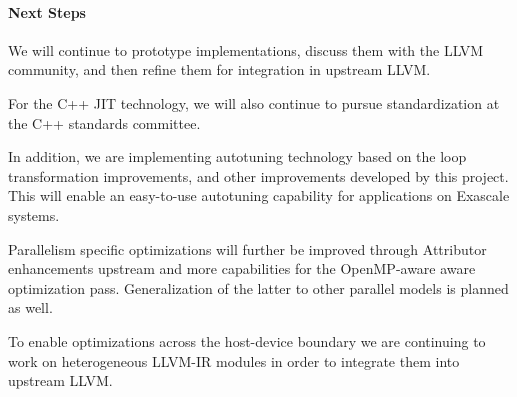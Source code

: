 \paragraph{Next Steps}
We will continue to prototype implementations, discuss them with the LLVM
community, and then refine them for integration in upstream LLVM.

For the C++ JIT technology, we will also continue to pursue standardization at
the C++ standards committee.

In addition, we are implementing autotuning technology based on the loop
transformation improvements, and other improvements developed by this project.
This will enable an easy-to-use autotuning capability for applications on
Exascale systems.

Parallelism specific optimizations will further be improved through Attributor
enhancements upstream and more capabilities for the OpenMP-aware aware
optimization pass. Generalization of the latter to other parallel models is
planned as well.

To enable optimizations across the host-device boundary we are continuing to
work on heterogeneous LLVM-IR modules in order to integrate them into upstream
LLVM.


%
